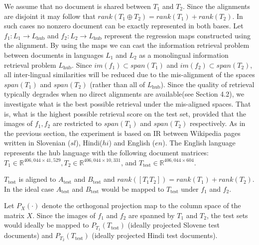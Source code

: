 \documentclass[twocolumn, draft]{article}
\begin{document}



We assume that no document is shared between $T_1$ and
$T_2$. Since the alignments are disjoint it may follow that
$rank( T_1 \oplus T_2) = rank( T_1) + rank( T_2)$.
In such cases no nonzero document can be exactly
represented in both bases.
%
%
Let $f_{1}: L_1 \rightarrow L_{\mathrm{hub}}$ and $f_{2}: L_2
\rightarrow L_{\mathrm{hub}}$ represent the regression maps
constructed using the alignment. By using the maps we can cast
the information retrieval problem between documents in languages
$L_1$ and $L_2$ as a monolingual information retrieval problem
$L_{\mathrm{hub}}$. Since $im(f_{1}) \subset span(T_1)$ and
$im(f_{2}) \subset span(T_2)$, all inter-lingual similarities
will be reduced due to the mis-alignment of the spaces
$span(T_1)$ and $span(T_2)$ (rather than all of
$L_{\mathrm{hub}}$). Since the quality of retrieval typically
degrades when no direct alignments are available(see Section
4.2), we investigate what is the best possible retrieval under
the mis-aligned spaces. That is, what is the highest possible
retrieval score on the test set, provided that the images of
$f_{1}, f_{2}$ are restricted to $span(T_1)$ and $span(T_2)$
respectively.
%
As in the previous section, the experiment is based on IR between
Wikipedia pages written in Slovenian ($sl$), Hindi($hi$) and English
($en$). The English language represents the hub language with the
following document matrices: $T_1 \in \mathbb{R}^{406,044
  \times 41,529}, T_2 \in \mathbb{R}^{406,044 \times
  10,331}$, and ${T}_{\mathrm{test}} \in \mathbb{R}^{406,044 \times
  604}$.

$T_{\mathrm{test}}$ is aligned to $A_{\mathrm{test}}$ and $B_{\mathrm{test}}$ and
  $rank([T_1 T_2]) = rank(T_1) + rank(T_2)$. In the ideal case
  $A_{\mathrm{test}}$ and $B_{\mathrm{test}}$ would be mapped to $T_{\mathrm{test}}$ under
  $f_{1}$ and $f_{2}$.

 Let $P_X(\cdot)$ denote the orthogonal projection map to the
 column space of the matrix $X$. Since the images of $f_{1}$ and
 $f_{2}$ are spanned by $T_1$ and $T_2$, the test sets would
 ideally be mapped to $P_{T_1}(T_{\mathrm{test}})$ (ideally
 projected Slovene test documents) and
 $P_{T_2}(T_{\mathrm{test}})$ (ideally projected Hindi test
 documents).
\end{document}
